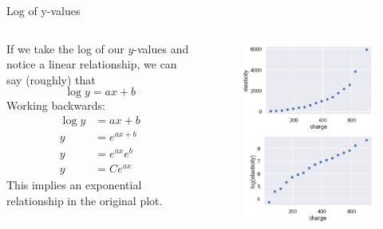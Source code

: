 \documentclass[aspectratio=169]{../latex_main/tntbeamer}  %
\begin{document}
	\begin{frame}{Log of y-values}
	    \begin{columns}
	        \begin{column}{.5\textwidth}
	                If we take the log of our $y$-values and notice a linear relationship, we can say (roughly) that
	                \begin{equation*}
	                    \log y = ax + b
	                \end{equation*}
	                Working backwards:
	                \begin{align*}
	                    \log y &= ax + b\\
	                    y &= e^{ax+b}\\
	                    y &= e^{ax}e^b\\
	                    y &= Ce^{ax}
	                \end{align*}
	                This implies an exponential relationship in the original plot.
	        \end{column}
	        
	        
	        \begin{column}{.5\textwidth}
	                \begin{figure}
	                    \includegraphics[scale=.3]{Bild96}
	                \end{figure}
	        \end{column}
	    \end{columns}
	\end{frame}
	
\end{document}
